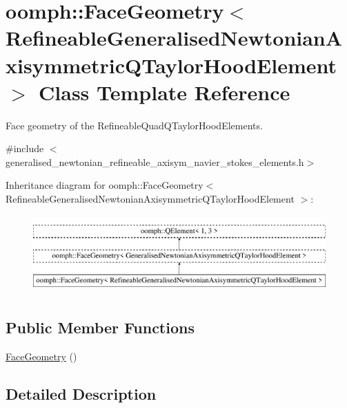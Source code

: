 \hypertarget{classoomph_1_1FaceGeometry_3_01RefineableGeneralisedNewtonianAxisymmetricQTaylorHoodElement_01_4}{}\section{oomph\+:\+:Face\+Geometry$<$ Refineable\+Generalised\+Newtonian\+Axisymmetric\+Q\+Taylor\+Hood\+Element $>$ Class Template Reference}
\label{classoomph_1_1FaceGeometry_3_01RefineableGeneralisedNewtonianAxisymmetricQTaylorHoodElement_01_4}


Face geometry of the Refineable\+Quad\+Q\+Taylor\+Hood\+Elements.  




{\ttfamily \#include $<$generalised\+\_\+newtonian\+\_\+refineable\+\_\+axisym\+\_\+navier\+\_\+stokes\+\_\+elements.\+h$>$}

Inheritance diagram for oomph\+:\+:Face\+Geometry$<$ Refineable\+Generalised\+Newtonian\+Axisymmetric\+Q\+Taylor\+Hood\+Element $>$\+:\begin{figure}[H]
\begin{center}
\leavevmode
\includegraphics[height=3.000000cm]{classoomph_1_1FaceGeometry_3_01RefineableGeneralisedNewtonianAxisymmetricQTaylorHoodElement_01_4}
\end{center}
\end{figure}
\subsection*{Public Member Functions}
\begin{DoxyCompactItemize}
\item 
\hyperlink{classoomph_1_1FaceGeometry_3_01RefineableGeneralisedNewtonianAxisymmetricQTaylorHoodElement_01_4_a4f74e4b3980deba3995225e37cca04fd}{Face\+Geometry} ()
\end{DoxyCompactItemize}


\subsection{Detailed Description}
